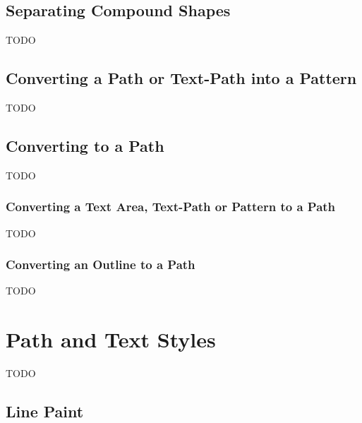 \section{Separating Compound Shapes}\label{sec:separate}


TODO


\section{Converting a Path or Text-Path into a Pattern}\label{sec:patterns}





TODO


\section{Converting to a Path}\label{sec:converttopath}



TODO


\subsection{Converting a Text Area, Text-Path or Pattern to a Path}\label{sec:texttopath}

TODO


\subsection{Converting an Outline to a Path}\label{sec:outlinetopath}

TODO


\chapter{Path and Text Styles}\label{sec:styles}

TODO


\section{Line Paint}\label{sec:linepaint}

